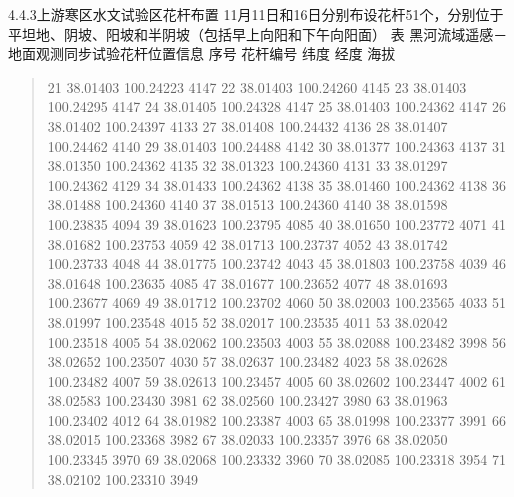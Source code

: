 \documentclass[letterpaper,10pt,english]{sphinxmanual}
\begin{document}
4.4.3上游寒区水文试验区花杆布置
11月11日和16日分别布设花杆51个，分别位于平坦地、阴坡、阳坡和半阴坡（包括早上向阳和下午向阳面）
表 黑河流域遥感－地面观测同步试验花杆位置信息
序号      花杆编号    纬度      经度      海拔
\begin{quote}

21      38.01403        100.24223       4147
22      38.01403        100.24260       4145
23      38.01403        100.24295       4147
24      38.01405        100.24328       4147
25      38.01403        100.24362       4147
26      38.01402        100.24397       4133
27      38.01408        100.24432       4136
28      38.01407        100.24462       4140
29      38.01403        100.24488       4142
30      38.01377        100.24363       4137
31      38.01350        100.24362       4135
32      38.01323        100.24360       4131
33      38.01297        100.24362       4129
34      38.01433        100.24362       4138
35      38.01460        100.24362       4138
36      38.01488        100.24360       4140
37      38.01513        100.24360       4140
38      38.01598        100.23835       4094
39      38.01623        100.23795       4085
40      38.01650        100.23772       4071
41      38.01682        100.23753       4059
42      38.01713        100.23737       4052
43      38.01742        100.23733       4048
44      38.01775        100.23742       4043
45      38.01803        100.23758       4039
46      38.01648        100.23635       4085
47      38.01677        100.23652       4077
48      38.01693        100.23677       4069
49      38.01712        100.23702       4060
50      38.02003        100.23565       4033
51      38.01997        100.23548       4015
52      38.02017        100.23535       4011
53      38.02042        100.23518       4005
54      38.02062        100.23503       4003
55      38.02088        100.23482       3998
56      38.02652        100.23507       4030
57      38.02637        100.23482       4023
58      38.02628        100.23482       4007
59      38.02613        100.23457       4005
60      38.02602        100.23447       4002
61      38.02583        100.23430       3981
62      38.02560        100.23427       3980
63      38.01963        100.23402       4012
64      38.01982        100.23387       4003
65      38.01998        100.23377       3991
66      38.02015        100.23368       3982
67      38.02033        100.23357       3976
68      38.02050        100.23345       3970
69      38.02068        100.23332       3960
70      38.02085        100.23318       3954
71      38.02102        100.23310       3949
\end{quote}
\end{document}
